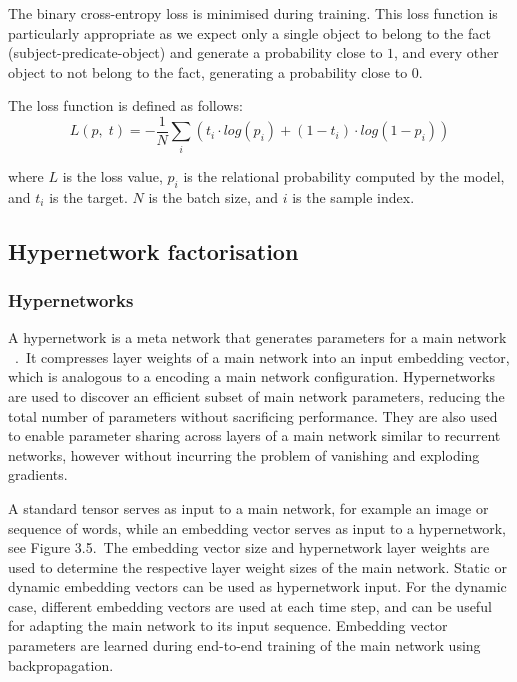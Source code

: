 \noindent The binary cross-entropy loss is minimised during training. This loss function is particularly appropriate as we expect only a single object to belong to the fact (subject-predicate-object) and generate a probability close to $ 1 $, and every other object to not belong to the fact, generating a probability close to $ 0 $. \par

\noindent The loss function is defined as follows:
\begin{equation}
	L(p, \; t) =  -\frac{1}{N}\sum_i(t_i \cdot log(p_i) + (1 - t_i) \cdot log(1 - p_i))
\end{equation}

\noindent where $ L $ is the loss value, $ p_i $ is the relational probability computed by the model, and $ t_i $ is the target. $ N $ is the batch size, and $ i $ is the sample index.




\subsection{Hypernetwork factorisation}

\subsubsection{Hypernetworks}

A hypernetwork is a meta network that generates parameters for a main network \unskip ~\citep{ha2016hypernetworks}.\ It compresses layer weights of a main network into an input embedding vector, which is analogous to a encoding a main network configuration. Hypernetworks are used to discover an efficient subset of main network parameters, reducing the total number of parameters without sacrificing performance. They are also used to enable parameter sharing across layers of a main network similar to recurrent networks, however without incurring the problem of vanishing and exploding gradients. \par

\noindent A standard tensor serves as input to a main network, for example an image or sequence of words, while an embedding vector serves as input to a hypernetwork, see Figure 3.5.\ The embedding vector size and hypernetwork layer weights are used to determine the respective layer weight sizes of the main network. Static or dynamic embedding vectors  can be used as hypernetwork input. For the dynamic case, different embedding vectors are used at each time step, and can be useful for adapting the main network to its input sequence. Embedding vector parameters are learned during end-to-end training of the main network using backpropagation. \par


